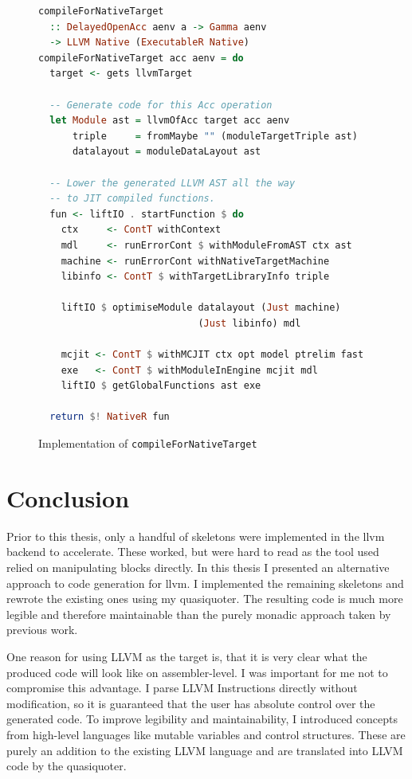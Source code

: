 \documentclass[a4paper,bibliography=totocnumbered,parskip,headsepline]{scrbook}
\begin{document}
\begin{figure}
\begin{lstlisting}[language=haskell]
compileForNativeTarget
  :: DelayedOpenAcc aenv a -> Gamma aenv
  -> LLVM Native (ExecutableR Native)
compileForNativeTarget acc aenv = do
  target <- gets llvmTarget

  -- Generate code for this Acc operation
  let Module ast = llvmOfAcc target acc aenv
      triple     = fromMaybe "" (moduleTargetTriple ast)
      datalayout = moduleDataLayout ast

  -- Lower the generated LLVM AST all the way
  -- to JIT compiled functions.
  fun <- liftIO . startFunction $ do
    ctx     <- ContT withContext
    mdl     <- runErrorCont $ withModuleFromAST ctx ast
    machine <- runErrorCont withNativeTargetMachine
    libinfo <- ContT $ withTargetLibraryInfo triple

    liftIO $ optimiseModule datalayout (Just machine)
                            (Just libinfo) mdl

    mcjit <- ContT $ withMCJIT ctx opt model ptrelim fast
    exe   <- ContT $ withModuleInEngine mcjit mdl
    liftIO $ getGlobalFunctions ast exe

  return $! NativeR fun
\end{lstlisting}
\caption{Implementation of \lstinline[language=haskell]!compileForNativeTarget!}
\label{fig:compilenative}
\end{figure}

\chapter{Conclusion}
Prior to this thesis, only a handful of skeletons were implemented in the llvm backend to accelerate.
These worked, but were hard to read as the tool used relied on manipulating blocks directly.
In this thesis I presented an alternative approach to code generation for llvm.
I implemented the remaining skeletons and rewrote the existing ones using my quasiquoter.
The resulting code is much more legible and therefore maintainable than the purely monadic approach taken by previous work.

One reason for using LLVM as the target is, that it is very clear what the produced code will look like on assembler-level.
I was important for me not to compromise this advantage.
I parse LLVM Instructions directly without modification, so it is guaranteed that the user has absolute control over the generated code.
To improve legibility and maintainability, I introduced concepts from high-level languages like mutable variables and control structures.
These are purely an addition to the existing LLVM language and are translated into LLVM code by the quasiquoter.
\end{document}
